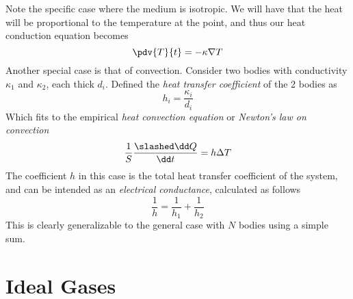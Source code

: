 \documentclass[../qm.tex]{subfiles}
\begin{document}
Note the specific case where the medium is isotropic. We will have that the heat will be proportional to the temperature at the point, and thus our heat conduction equation becomes
\begin{equation}
	\pdv{T}{t}=-\kappa\nabla T
	\label{eq:fourieriso.cond}
\end{equation}
Another special case is that of convection. Consider two bodies with conductivity $\kappa_1$ and $\kappa_2$, each thick $d_i$. Defined the \textit{heat transfer coefficient} of the 2 bodies as 
\begin{equation}
	h_i=\frac{\kappa_i}{d_i}
	\label{eq:heattransfer.cond}
\end{equation}
Which fits to the empirical \textit{heat convection equation} or \textit{Newton's law on convection}
\begin{equation}
	\frac{1}{S}\frac{\slashed\dd Q}{\dd t}=h\Delta T
	\label{eq:newton.cond}
\end{equation}
The coefficient $h$ in this case is the total heat transfer coefficient of the system, and can be intended as an \textit{electrical conductance}, calculated as follows
\begin{equation}
	\frac{1}{h}=\frac{1}{h_1}+\frac{1}{h_2}
	\label{eq:sumnewton.cond}
\end{equation}
This is clearly generalizable to the general case with $N$ bodies using a simple sum.
\section{Ideal Gases}
\end{document}
